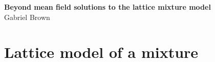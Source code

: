 \documentclass[10pt]{article}
\begin{document}
\begin{center}
    \textbf{\large Beyond mean field solutions to the lattice mixture model} \\
    Gabriel Brown
\end{center}




\section{Lattice model of a mixture} 
\end{document}
